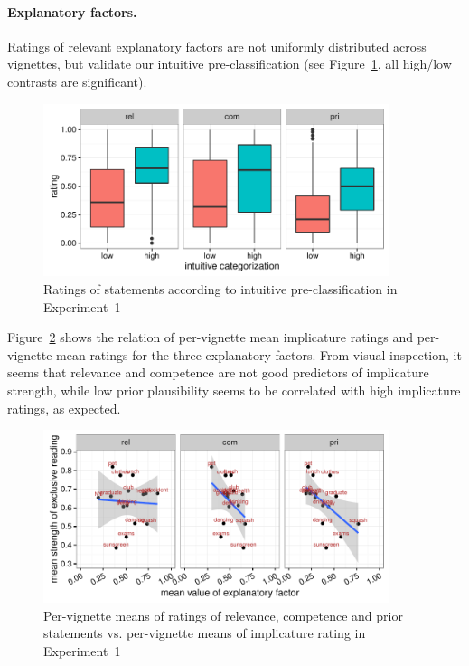\documentclass[12pt]{article}
\begin{document}

  

\paragraph{Explanatory factors.} Ratings of relevant explanatory factors are not uniformly
distributed across vignettes, but validate our intuitive pre-classification (see
Figure~\ref{fig:factorBoxPlots}, all high/low contrasts are significant).

\begin{figure}[t]
  \centering

  \includegraphics[width = 0.9\textwidth]{pics/factorBoxPlotExp1.pdf}
  
  \caption{Ratings of statements according to intuitive pre-classification in Experiment~1}
  \label{fig:factorBoxPlots}
\end{figure}

Figure~\ref{fig:correlationsExp1} shows the relation of per-vignette mean implicature ratings
and per-vignette mean ratings for the three explanatory factors. From visual inspection, it
seems that relevance and competence are not good predictors of implicature strength, while low prior
plausibility seems to be correlated with high implicature ratings, as expected.

\begin{figure}[t]
  \centering

  \includegraphics[width = 0.9\textwidth]{pics/correlationExp1.pdf}
  
  \caption{Per-vignette means of ratings of relevance, competence and prior statements
    vs. per-vignette means of implicature rating in Experiment~1}
  \label{fig:correlationsExp1}
\end{figure}
\end{document}
